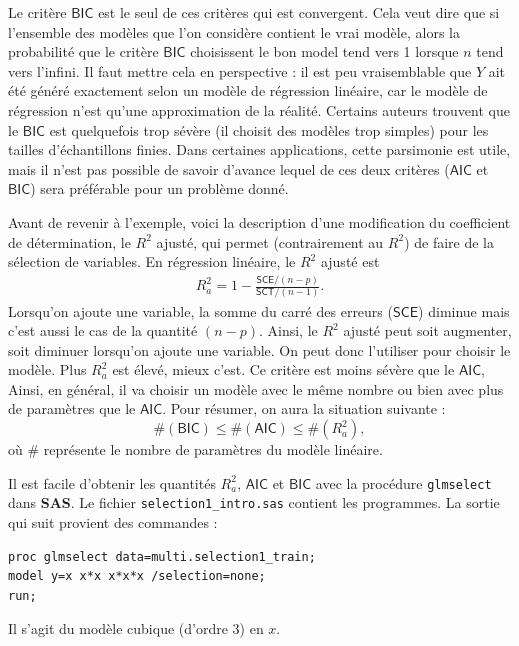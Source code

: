 \documentclass[
]{book}
\theoremstyle{definition}
\theoremstyle{definition}
\theoremstyle{definition}
\theoremstyle{remark}
\begin{document}
Le critère \(\mathsf{BIC}\) est le seul de ces critères qui est convergent. Cela veut dire que si l'ensemble des modèles que l'on considère contient le vrai modèle, alors la probabilité que le critère \(\mathsf{BIC}\) choisissent le bon model tend vers 1 lorsque \(n\) tend vers l'infini. Il faut mettre cela en perspective : il est peu vraisemblable que \(Y\) ait été généré exactement selon un modèle de régression linéaire, car le modèle de régression n'est qu'une approximation de la réalité. Certains auteurs trouvent que le \(\mathsf{BIC}\) est quelquefois trop sévère (il choisit des modèles trop simples) pour les tailles d'échantillons finies. Dans certaines applications, cette parsimonie est utile, mais il n'est pas possible de savoir d'avance lequel de ces deux critères (\(\mathsf{AIC}\) et \(\mathsf{BIC}\)) sera préférable pour un problème donné.

Avant de revenir à l'exemple, voici la description d'une modification du coefficient de détermination, le \(R^2\) ajusté, qui permet (contrairement au \(R^2\)) de faire de la sélection de variables. En régression linéaire, le \(R^2\) ajusté est
\begin{align*}
R^2_a=1-\frac{\mathsf{SCE}/(n-p)}{\mathsf{SCT}/(n-1)}.
\end{align*}
Lorsqu'on ajoute une variable, la somme du carré des erreurs (\(\mathsf{SCE}\)) diminue mais c'est aussi le cas de la quantité \((n-p)\). Ainsi, le \(R^2\) ajusté peut soit augmenter, soit diminuer lorsqu'on ajoute une variable. On peut donc l'utiliser pour choisir le modèle. Plus \(R^2_a\) est élevé, mieux c'est. Ce critère est moins sévère que le \(\mathsf{AIC}\), Ainsi, en général, il va choisir un modèle avec le même nombre ou bien avec plus de paramètres que le \(\mathsf{AIC}\). Pour résumer, on aura la situation suivante :
\[ \#(\mathsf{BIC}) \leq \#(\mathsf{AIC}) \leq \#(R^2_a),\]
où \(\#\) représente le nombre de paramètres du modèle linéaire.

Il est facile d'obtenir les quantités \(R^2_a\), \(\mathsf{AIC}\) et \(\mathsf{BIC}\) avec la procédure \texttt{glmselect} dans \textbf{SAS}. Le fichier \texttt{selection1\_intro.sas} contient les programmes. La sortie qui suit provient des commandes :

\begin{verbatim}
proc glmselect data=multi.selection1_train;
model y=x x*x x*x*x /selection=none;
run;
\end{verbatim}

Il s'agit du modèle cubique (d'ordre 3) en \(x\).
\end{document}
